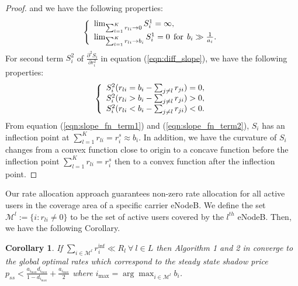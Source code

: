 \documentclass[journal]{IEEEtran} 		\usepackage{amsmath,amssymb}
\newtheorem{cor}[thm]{Corollary}
\begin{document}
\begin{proof}
and we have the following properties:
\begin{equation}\label{eqn:slope_fn_term1}
\left\{
\begin{array}{l l}
   \lim_{\sum_{l=1}^{K}r_{li} \rightarrow 0} S^1_i = \infty,\\
   \lim_{\sum_{l=1}^{K}r_{li} \rightarrow b_i} S^1_i = 0 \:\:\text{for} \:\:b_i 	\gg \frac{1}{a_i}.
\end{array} \right.
\end{equation}
For second term $S^2_i$ of $\frac{\partial^2 S_i}{\partial r_i^2}$ in equation (\ref{eqn:diff_slope}), we have the following properties:
\begin{equation}\label{eqn:slope_fn_term2}
\left\{
\begin{array}{l l}
   S^2_i (r_{li}=b_{i}-\sum_{j\neq l} r_{ji}) = 0,\\
   S^2_i (r_{li}>b_{i}-\sum_{j\neq l} r_{ji}) > 0,\\
   S^2_i (r_{li}<b_{i}-\sum_{j\neq l} r_{ji}) < 0.
\end{array} \right.
\end{equation}
From equation (\ref{eqn:slope_fn_term1}) and (\ref{eqn:slope_fn_term2}), $S_i$ has an inflection point at $\sum_{l=1}^{K}r_{li} = r_i^{s}\approx b_i$. In addition, we have the curvature of $S_i$ changes from a convex function close to origin to a concave function before the inflection point $\sum_{l=1}^{K}r_{li} = r_i^{s}$ then to a convex function after the inflection point.
\end{proof}
Our rate allocation approach guarantees non-zero rate allocation for all active users in the coverage area of a specific carrier eNodeB. We define the set $\mathcal{M}^{l}:=\{i:r_{li} \neq 0\}$ to be the set of active users covered by the $l^{th}$ eNodeB. Then, we have the following Corollary.
\begin{cor}\label{cor:sig_convergence}
If $\sum_{i \in \mathcal{M}^{l}}r_i^{\text{inf}} \ll R_l \: \forall \: l\in L$ then Algorithm 1 and  2 in \cite{Ahmed_Utility4} converge to the global optimal rates which correspond to the steady state shadow price $p_{ss}< \frac{a_{i_{\max}} d_{i_{\max}} }{1-d_{i_{\max}} }+\frac{a_{i_{\max} }}{2}$ where $i_{\max} = \arg \max_{i \in \mathcal{M}^{l}} b_i$.
\end{cor}
\end{document}
